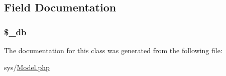 \subsection{Field Documentation}
\hypertarget{class_model_abc686c23af6ae116b72bc6adb4482a1f}{}
\subsubsection[{\$\+\_\+db}]{\setlength{\rightskip}{0pt plus 5cm}\$\+\_\+db\hspace{0.3cm}{\ttfamily [protected]}}\label{class_model_abc686c23af6ae116b72bc6adb4482a1f}


The documentation for this class was generated from the following file\+:\begin{DoxyCompactItemize}
\item 
sys/\hyperlink{_model_8php}{Model.\+php}\end{DoxyCompactItemize}
